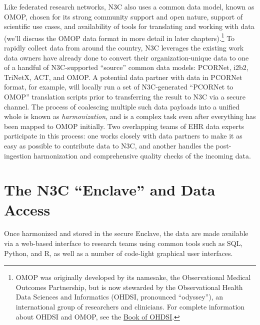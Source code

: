 \documentclass[
  letterpaper,
  DIV=11,
  numbers=noendperiod]{scrreprt}
\begin{document}
Like federated research networks, N3C also uses a common data model,
known as OMOP, chosen for its strong community support and open nature,
support of scientific use cases, and availability of tools for
translating and working with data (we'll discuss the OMOP data format in
more detail in later chapters).\footnote{OMOP was originally developed
  by its namesake, the Observational Medical Outcomes Partnership, but
  is now stewarded by the Observational Health Data Sciences and
  Informatics (OHDSI, pronounced ``odyssey''), an international group of
  researchers and clinicians. For complete information about OHDSI and
  OMOP, see the \href{https://ohdsi.github.io/TheBookOfOhdsi/}{Book of
  OHDSI}.} To rapidly collect data from around the country, N3C
leverages the existing work data owners have already done to convert
their organization-unique data to one of a handful of N3C-supported
``source'' common data models: PCORNet, i2b2, TriNetX, ACT, and OMOP. A
potential data partner with data in PCORNet format, for example, will
locally run a set of N3C-generated ``PCORNet to OMOP'' translation
scripts prior to transferring the result to N3C via a secure channel.
The process of coalescing multiple such data payloads into a unified
whole is known as \emph{harmonization}, and is a complex task even after
everything has been mapped to OMOP initially. Two overlapping teams of
EHR data experts participate in this process: one works closely with
data partners to make it as easy as possible to contribute data to N3C,
and another handles the post-ingestion harmonization and comprehensive
quality checks of the incoming data.

\hypertarget{the-n3c-enclave-and-data-access}{%
\section{The N3C ``Enclave'' and Data
Access}\label{the-n3c-enclave-and-data-access}}

Once harmonized and stored in the secure Enclave, the data are made
available via a web-based interface to research teams using common tools
such as SQL, Python, and R, as well as a number of code-light graphical
user interfaces.
\end{document}
